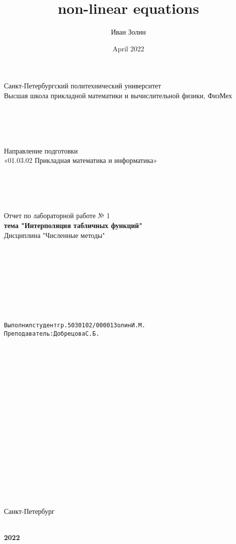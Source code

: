 \documentclass{article}
\title{non-linear equations}
\author{Иван Золин}
\date{April 2022}
\begin{document}
	
	\large
	\begin{center}
		
		Санкт-Петербургский политехнический университет\\
		Высшая школа прикладной математики и вычислительной физики, ФизМех
		
		~\\
		~\\
		~\\
		~\\
		Направление подготовки\\
		«01.03.02 Прикладная математика и информатика»
		
		~\\
		~\\
		~\\
		~\\
		Отчет по лабораторной работе № 1\\
		\textbf{тема "Интерполяция табличных функций" }	
		~\\	Дисциплина "Численные методы"
	\end{center}
	
	~\\
	~\\
	~\\
	~\\
	~\\
	~\\
	~\\
	\begin{alltt}
		\begin{center}
			Выполнил студент гр. 5030102/00001			  		   		  Золин И.М.
			Преподаватель: 				              	        	Добрецова С.Б.
		\end{center}
		
	\end{alltt}
	
	~\\
	~\\
	~\\
	~\\
	~\\
	~\\
	~\\
	~\\
	~\\
	~\\
	~\\
	~\\
	~\\
	~\\
	~\\
	~\\
	\begin{center}
		Санкт-Петербург
		
		~\\
		\textbf{2022}
		
	\end{center}{}
	
\end{document}
